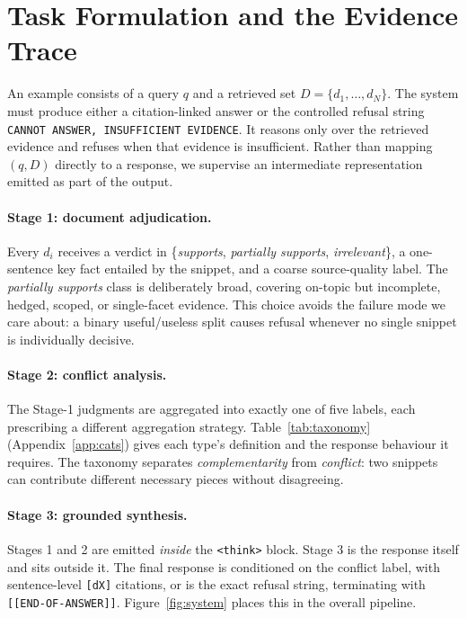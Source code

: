 \section{Task Formulation and the Evidence Trace}
\label{sec:method}

An example consists of a query $q$ and a retrieved set $D=\{d_1,\dots,d_N\}$. The
system must produce either a citation-linked answer or the controlled refusal
string \texttt{CANNOT ANSWER, INSUFFICIENT EVIDENCE}. It reasons only over the
retrieved evidence and refuses when that evidence is insufficient. Rather than
mapping $(q,D)$ directly to a response, we supervise an intermediate
representation emitted as part of the output.

\paragraph{Stage 1: document adjudication.} Every $d_i$ receives a verdict in
\{\textit{supports}, \textit{partially supports}, \textit{irrelevant}\}, a
one-sentence key fact entailed by the snippet, and a coarse source-quality label.
The \textit{partially supports} class is deliberately broad, covering on-topic
but incomplete, hedged, scoped, or single-facet evidence. This choice avoids
the failure mode we care about: a binary useful/useless split causes refusal
whenever no single snippet is individually decisive.

\paragraph{Stage 2: conflict analysis.} The Stage-1 judgments are aggregated into
exactly one of five labels, each prescribing a different aggregation strategy.
Table~\ref{tab:taxonomy} (Appendix~\ref{app:cats}) gives each type's definition
and the response behaviour it requires. The taxonomy separates
\emph{complementarity} from \emph{conflict}: two snippets can contribute
different necessary pieces without disagreeing.

\paragraph{Stage 3: grounded synthesis.} Stages 1 and 2 are emitted \emph{inside}
the \verb|<think>| block. Stage 3 is the response itself and sits outside it. The
final response is conditioned on the conflict label, with sentence-level
\texttt{[dX]} citations, or is the exact refusal string, terminating with
\verb|[[END-OF-ANSWER]]|. Figure~\ref{fig:system} places this in the overall
pipeline.

